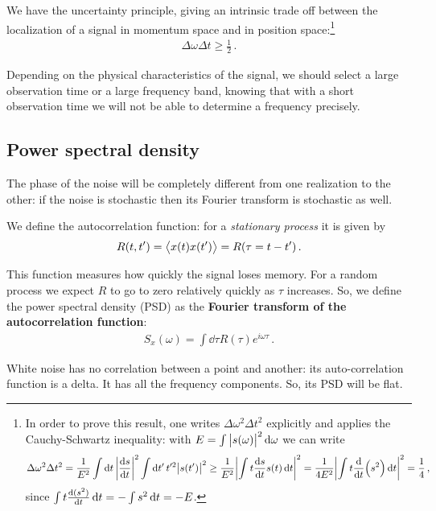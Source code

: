\documentclass[main.tex]{subfiles}
\begin{document}
We have the uncertainty principle, giving an intrinsic trade off between the localization of a signal in momentum space and in position space:\footnote{In order to prove this result, one writes \(\Delta \omega^2 \Delta t^2 \) explicitly and applies the Cauchy-Schwartz inequality: with \(E = \int \abs{s(\omega )}^2 \dd{\omega }\) we can write
%
\begin{align}
\Delta \omega^2 \Delta t^2 
= \frac{1}{E^2} \int \dd{t} \abs{\dv{s}{t}}^2
 \int \dd{t'} t^{\prime 2} \abs{s(t')}^2 \geq \frac{1}{E^2} \abs{\int t \dv{s}{t} s(t) \dd{t}}^2 
 = \frac{1}{4 E^2} \abs{\int t \dv{}{t} \qty(s^2)  \dd{t} }^2  
 = \frac{1}{4}
\,,
\end{align}
%
since \(\int t \dv{(s^2)}{t} \dd{t} = - \int s^2 \dd{t} = - E\). 
}
%
\begin{align}
\Delta \omega \Delta t \geq \frac{1}{2} 
\,.
\end{align}

Depending on the physical characteristics of the signal, we should select a large observation time or a large frequency band, knowing that with a short observation time we will not be able to determine a frequency precisely.    

\subsection{Power spectral density}

The phase of the noise will be completely different from one realization to the other: if the noise is stochastic then its Fourier transform is stochastic as well. 

We define the autocorrelation function: for a \emph{stationary process} it is given by
%
\begin{align}
R(t, t')  = \expval{x(t) x(t')} = R(\tau =  t - t') 
\,.
\end{align}

This function measures how quickly the signal loses memory. For a random process we expect \(R\) to go to zero relatively quickly as \(\tau \) increases. 
So, we define the power spectral density (PSD) as the \textbf{Fourier transform of the autocorrelation function}: 
%
\begin{align}
S_x (\omega ) = \int  \dd{\tau } R(\tau ) e^{i \omega \tau } 
\,.
\end{align}

White noise has no correlation between a point and another: its auto-correlation function is a delta. It has all the frequency components. So, its PSD will be flat.
\end{document}
